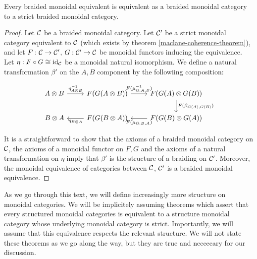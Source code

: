 \begin{prop}\label{braided-coherence-theorem} Every braided monoidal equivalent is equivalent as a braided monoidal category to a strict braided monoidal category.
\end{prop}
\begin{proof} Let ${\mathcal C}$ be a braided monoidal category. Let ${\mathcal C}'$ be a strict monoidal category equivalent to ${\mathcal C}$ (which exists by theorem \ref{maclane-coherence-theorem}), and let $F:{\mathcal C}\to{\mathcal C}'$, $G:{\mathcal C}'\to {\mathcal C}$ be monoidal functors inducing the equivalence. Let $\eta:F\circ G\cong \operatorname{id}_{{\mathcal C}}$ be a monoidal natural isomorphism. We define a natural transformation $\beta'$ on the $A,B$ component by the followiing composition:

\[\begin{tikzcd}
	{A\otimes B} & {F(G(A\otimes B))} & {F(G(A)\otimes G(B))} \\
	{B\otimes A} & {F(G(B\otimes A))} & {F(G(B)\otimes G(A))}
	\arrow["{\eta^{-1}_{A\otimes B}}", from=1-1, to=1-2]
	\arrow["{F(\mu^{-1}_{G;A,B})}", from=1-2, to=1-3]
	\arrow["{F(\beta_{G(A),G(B)})}", from=1-3, to=2-3]
	\arrow["{\eta_{B\otimes A}}", from=2-2, to=2-1]
	\arrow["{F(\mu_{G;B,A})}", from=2-3, to=2-2]
\end{tikzcd}\]

It is a straightforward to show that the axioms of a braided monoidal category on ${\mathcal C}$, the axioms of a monoidal functor on $F,G$ and the axioms of a natural transformation on $\eta$ imply that $\beta'$ is the structure of a braiding on ${\mathcal C}'$. Moreover, the monoidal equivalence of categories between ${\mathcal C}$, ${\mathcal C}'$ is a braided monoidal equivalence.
\end{proof}

\begin{rem}
As we go through this text, we will define increasingly more structure on monoidal categories. We will be implicitely assuming theorems which assert that every structured monoidal categories is equivalent to a structure monoidal category whose underlying monoidal category is strict. Importantly, we will assume that this equivalence respects the relevant structure. We will not state these theorems as we go along the way, but they are true and neccecary for our discussion.
\end{rem}


